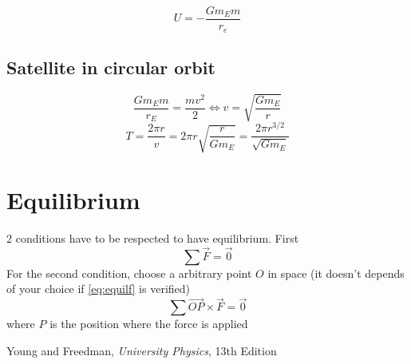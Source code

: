 \documentclass[a4paper,10pt]{article}
\begin{document}
\[U = -\frac{Gm_Em}{r_e}\]

\subsection{Satellite in circular orbit}
\[ \frac{Gm_Em}{r_E} = \frac{mv^2}{2} \Leftrightarrow v = \sqrt{\frac{Gm_E}{r}} \]
\[T = \frac{2\pi r}{v} = 2\pi r \sqrt{\frac{r}{Gm_E}} = \frac{2\pi r^{3/2}}{\sqrt{Gm_E}}\]

\section{Equilibrium}
2 conditions have to be respected to have equilibrium. First
\begin{equation}\label{eq:equilf}
	\sum \vec{F} = \vec{0}
\end{equation}
For the second condition, choose a arbitrary point $O$ in space
(it doesn't depends of your choice if \eqref{eq:equilf} is verified)
$$\sum \vec{OP} \times \vec{F} = \vec{0}$$
where $P$ is the position where the force is applied


\begin{thebibliography}{9}

	Young and Freedman,
	\emph{University Physics},
	13th Edition

\end{thebibliography}
\end{document}
